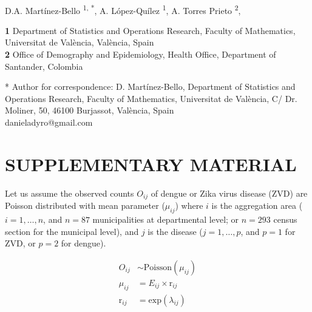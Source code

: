 \documentclass[10pt,letterpaper]{article}
\date{}
\begin{document}
\vspace*{0.2in}

\begin{flushleft}
{\Large
\textbf{}
}
\newline
\\
D.A. Mart\'{i}nez-Bello       \textsuperscript{1, *},
A. L\'{o}pez-Qu\'{i}lez       \textsuperscript{1},
A. Torres Prieto            \textsuperscript{2},


\bigskip
\textbf{1} Department of Statistics and Operations Research, Faculty of Mathematics, Universitat de Val\`{e}ncia, Val\`{e}ncia, Spain
\\
\textbf{2} Office of Demography and Epidemiology, Health Office, Department of Santander, Colombia
\\
\bigskip

* Author for correspondence: D. Mart\'{i}nez-Bello, Department of Statistics and Operations Research, Faculty of Mathematics, Universitat de Val\`{e}ncia, C/ Dr. Moliner, 50, 46100 Burjassot, Val\`{e}ncia, Spain \\
danieladyro@gmail.com

\end{flushleft}

\newpage


\section*{SUPPLEMENTARY MATERIAL}

\setcounter{figure}{0}
\renewcommand{\thefigure}{S\arabic{figure}}

\setcounter{table}{0}
\renewcommand{\thetable}{S\arabic{table}}

Let us assume the observed counts $O_{ij}$ of dengue or Zika virus disease (ZVD) are Poisson distributed with mean parameter ($\mu_{ij}$) where $i$ is the aggregation area ($i=1,\dots, n$, and $n = 87$ municipalities at departmental level; or $n = 293$ census section for the municipal level), and $j$ is the disease ($j=1,\dots,p$, and $p = 1$ for ZVD, or $p = 2$ for dengue). 

\begin{align*}
O_{ij}         &\sim   \mbox{Poisson}(\mu_{ij})\\
\mu_{ij}       &=    E_{ij} \times \mbox{r}_{ij}\\
\mbox{r}_{ij}  &= \mbox{exp}(\lambda_{ij})
\end{align*}
\end{document}
